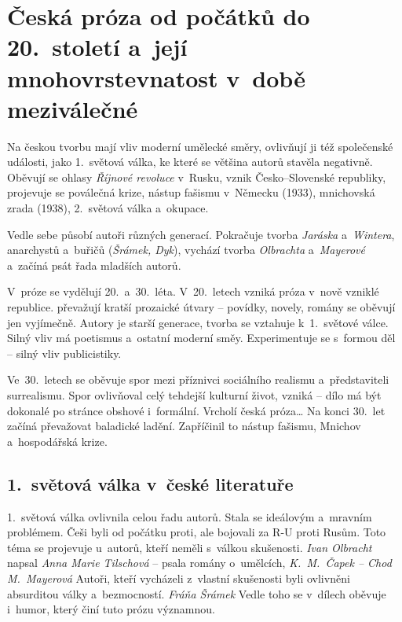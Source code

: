 \chapter[Česká próza od počátků do 20.~století]{Česká próza od počátků do 20.~století a~její mnohovrstevnatost v~době meziválečné}

Na českou tvorbu mají vliv moderní umělecké směry, ovlivňují ji též
společenské události, jako 1.~světová válka, ke které se většina autorů
stavěla negativně. Oběvují se ohlasy \emph{Říjnové revoluce} v~Rusku,
vznik Česko--Slovenské republiky, projevuje se poválečná krize, nástup
fašismu v~Německu (1933), mnichovská zrada (1938), 2.~světová válka
a~okupace.

Vedle sebe působí autoři různých generací. Pokračuje tvorba
\emph{Jaráska} a~\emph{Wintera}, anarchystů a~buřičů (\emph{Šrámek,
Dyk}), vychází tvorba \emph{Olbrachta} a~\emph{Mayerové} a~začíná psát
řada mladších autorů.

V~próze se vydělují 20.~a~30.~léta. V~20.~letech vzniká próza v~nově
vzniklé republice. převažují kratší prozaické útvary -- povídky, novely,
romány  se oběvují jen vyjímečně. Autory je starší generace, tvorba se
vztahuje k~1.~světové válce. Silný vliv má poetismus a~ostatní moderní
směy. Experimentuje se s~formou děl -- silný vliv publicistiky.

Ve~30.~letech se oběvuje spor mezi příznivci sociálního realismu
a~představiteli surrealismu. Spor ovlivňoval celý tehdejší kulturní
život, vzniká  -- dílo má být dokonalé po stránce
obshové i~formální. Vrcholí česká próza\dots{} Na konci 30.~let začíná
převažovat baladické ladění. Zapříčinil to nástup fašismu, Mnichov
a~hospodářská krize. 

\section*{1.~světová válka v~české literatuře}
1.~světová válka ovlivnila celou řadu autorů. Stala se ideálovým
a~mravním problémem. Češi byli od počátku proti, ale bojovali za R-U proti
Rusům. Toto téma se projevuje u~autorů, kteří neměli s~válkou skušenosti.
\emph{Ivan Olbracht} napsal 
\emph{Anna Marie Tilschová}  -- psala romány o~umělcích,
\emph{K.~M.~Čapek -- Chod}  
\emph{M.~Mayerová} 
Autoři, kteří vycházeli z~vlastní skušenosti byli ovlivněni absurditou
války a~bezmocností. \emph{Fráňa Šrámek}  
Vedle toho se v~dílech oběvuje i~humor, který činí tuto prózu významnou.

